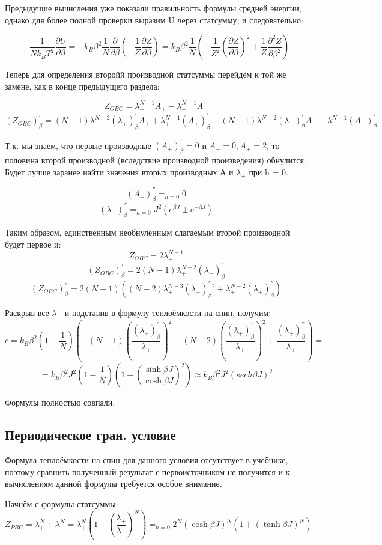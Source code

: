 \documentclass{article}
\newcommand{\bj}{\beta J}
\newcommand{\lp}{\lambda_{+}}
\newcommand{\lm}{\lambda_{-}}
\newcommand{\lpm}{\lambda_{\pm}}
\newcommand{\pbc}{_{PBC}}
\newcommand{\obc}{_{OBC}}
\newcommand{\dzdb}{\frac{\partial Z}{\partial \beta}}
\newcommand{\prpb}{^{'}_{\beta}}
\newcommand{\vprpb}{^{''}_{\beta}}
\numberwithin{equation}{section}
\begin{document}
Предыдущие вычисления уже показали правильность формулы средней энергии, однако для более полной проверки выразим U через статсумму, и следовательно:

\[ -\frac{1}{N k_{B} T^{2}} \frac{\partial U}{\partial \beta} = - k_{B} \beta^{2} \frac{1}{N} \frac{\partial}{\partial \beta} (- \frac{1}{Z} \dzdb) = k_{B} \beta^{2} \frac{1}{N} (- \frac{1}{Z^{2}} (\dzdb)^{2} + \frac{1}{Z} \frac{\partial^{2} Z}{\partial \beta^{2}}) \]

Теперь для определения второйй производной статсуммы перейдём к той же замене, как в конце предыдущего раздела:

\[ Z\obc = \lp^{N-1} A_{+} - \lm^{N-1} A_{-} \]
\[ (Z\obc)\prpb = (N-1) \lp^{N-2} (\lp)\prpb A_{+} + \lp^{N-1} (A_{+})\prpb - (N-1) \lm^{N-2} (\lm)\prpb A_{-} - \lm^{N-1} (A_{-})\prpb \]

Т.к. мы знаем, что первые производные $(A_{\pm})\prpb = 0$ и $A_{-} = 0, A_{+} = 2$, то половина второй производной (вследствие производной произведения) обнулится. Будет лучше заранее найти значения вторых производных А и $\lpm$ при h = 0.

\[ (A_{\pm})\vprpb =_{h=0} 0 \]
\[ (\lpm)\vprpb =_{h=0} J^{2}(e^{\bj} \pm e^{-\bj}) \]

Таким образом, единственным необнулённым слагаемым второй производной будет первое и:
\[ Z\obc = 2\lp^{N-1} \]
\[ (Z\obc)\prpb = 2(N-1) \lp^{N-2} (\lp)\prpb\]
\[ (Z\obc)\vprpb = 2(N-1)((N-2)\lp^{N-3}(\lp)\prpb ^{2} + \lp^{N-2}(\lp)\vprpb) \]

Раскрыв все $\lp$ и подставив в формулу теплоёмкости на спин, получим:
\[ c = k_{B} \beta^{2} (1 - \frac{1}{N}) (- (N-1) (\frac{(\lp)\prpb}{\lp})^{2} + (N-2) (\frac{(\lp)\prpb}{\lp})^{2} + \frac{(\lp)\vprpb}{\lp}) =\]
\[ = k_{B} \beta^{2} J^{2} (1 - \frac{1}{N}) (1 - (\frac{\sinh{\bj}}{\cosh{\bj}})^{2}) \approx k_{B} \beta^{2} J^{2} (sech \bj)^{2} \]

Формулы полностью совпали.

\subsection{Периодическое гран. условие}

Формула теплоёмкости на спин для данного условия отсутствует в учебнике, поэтому сравнить полученный результат с первоисточником не получится и к вычислениям данной формулы требуется особое внимание.

Начнём с формулы статсуммы:
\[ Z\pbc = \lambda_{+}
 ^{N} + \lambda _{-} ^{N} = \lp^{N}(1 + (\frac{\lp}{\lm})^{N}) =_{h=0} 2^{N} (\cosh{\bj})^{N} (1 + (\tanh{\bj})^{N}) \]
 
\end{document}
